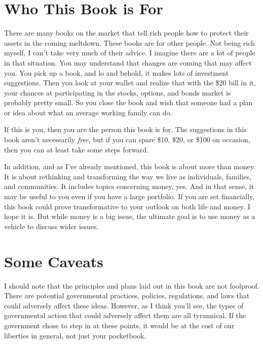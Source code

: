 \section{Who This Book is For}
{\color{black}
There are many books on the market that tell rich people how to protect
their assets in the coming meltdown. These books are for other people.
Not being rich
\textcolor[rgb]{0.32941177,0.5529412,0.83137256}{myself}, I can’t take
very much of their advice. I imagine there are a lot of people in that
situation. You may understand that changes are coming that may affect
you. You pick up a book, and lo and behold, it makes lots of investment
suggestions. Then you look at your wallet and realize that with the
\$20 bill in it, your chances at participating in the stocks, options,
and bonds market is probably pretty small. So you close the book and
wish that someone had a plan or idea about what an average working
family can do.}

{\color{black}
If this is you, then you are the person this book is for. The
suggestions in this book aren’t necessarily \textit{free}, but if you
can spare \$10, \$20, or \$100 on occasion, then you can at least take
some steps forward.}

{\color{black}
In addition, \textcolor[rgb]{0.32941177,0.5529412,0.83137256}{and}
\textcolor[rgb]{0.32941177,0.5529412,0.83137256}{as I’ve already
mentioned, }this book is about more than money. It is about rethinking
and transforming the way we live as individuals, families, and
communities. It includes topics concerning money, yes. And in that
sense, it may be useful to you even if you have a large portfolio. If
you are set financially, this book could prove transformative to your
outlook on both life and money.
\textcolor[rgb]{0.32941177,0.5529412,0.83137256}{I hope it is. But
w}hile money is a big issue, the ultimate goal is to use money as a
vehicle to discuss wider issues. }

\section[Some Caveats]{Some Caveats}
{\color{black}
I should note that the principles and plans laid out in this book are
not foolproof. There are potential governmental practices, policies,
regulations, and laws that could adversely affect these ideas. However,
as I think you’ll see, the types of governmental action that could
adversely affect them are all tyrannical. If the government chose to
step in at these points, it would be at the cost of our liberties in
general, not just your pocketbook. }

